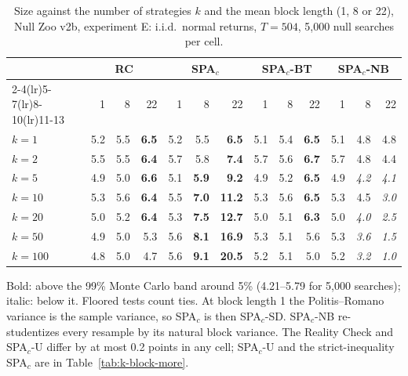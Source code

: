 \begin{table}[t]
\centering
\footnotesize
\setlength{\tabcolsep}{3.5pt}
\caption{Size against the number of strategies $k$ and the mean block length (1, 8 or 22), Null Zoo v2b, experiment E: i.i.d.\ normal returns, $T=504$, 5{,}000 null searches per cell.}
\label{tab:k-block}
\begin{tabular}{lrrrrrrrrrrrr}
\toprule
 & \multicolumn{3}{c}{RC} & \multicolumn{3}{c}{SPA$_c$} & \multicolumn{3}{c}{SPA$_c$-BT} & \multicolumn{3}{c}{SPA$_c$-NB} \\
\cmidrule(lr){2-4}\cmidrule(lr){5-7}\cmidrule(lr){8-10}\cmidrule(lr){11-13}
 & 1 & 8 & 22 & 1 & 8 & 22 & 1 & 8 & 22 & 1 & 8 & 22 \\
\midrule
$k=1$ & 5.2 & 5.5 & \textbf{6.5} & 5.2 & 5.5 & \textbf{6.5} & 5.1 & 5.4 & \textbf{6.5} & 5.1 & 4.8 & 4.8 \\
$k=2$ & 5.5 & 5.5 & \textbf{6.4} & 5.7 & 5.8 & \textbf{7.4} & 5.7 & 5.6 & \textbf{6.7} & 5.7 & 4.8 & 4.4 \\
$k=5$ & 4.9 & 5.0 & \textbf{6.6} & 5.1 & \textbf{5.9} & \textbf{9.2} & 4.9 & 5.2 & \textbf{6.5} & 4.9 & \textit{4.2} & \textit{4.1} \\
$k=10$ & 5.3 & 5.6 & \textbf{6.4} & 5.5 & \textbf{7.0} & \textbf{11.2} & 5.3 & 5.6 & \textbf{6.5} & 5.3 & 4.5 & \textit{3.0} \\
$k=20$ & 5.0 & 5.2 & \textbf{6.4} & 5.3 & \textbf{7.5} & \textbf{12.7} & 5.0 & 5.1 & \textbf{6.3} & 5.0 & \textit{4.0} & \textit{2.5} \\
$k=50$ & 4.9 & 5.0 & 5.3 & 5.6 & \textbf{8.1} & \textbf{16.9} & 5.3 & 5.1 & 5.6 & 5.3 & \textit{3.6} & \textit{1.5} \\
$k=100$ & 4.8 & 5.0 & 4.7 & 5.6 & \textbf{9.1} & \textbf{20.5} & 5.2 & 5.1 & 5.0 & 5.2 & \textit{3.2} & \textit{1.0} \\
\bottomrule
\end{tabular}
\par\smallskip\begin{minipage}{0.97\linewidth}\footnotesize Bold: above the 99\% Monte Carlo band around 5\% (4.21--5.79 for 5{,}000 searches); italic: below it. Floored tests count ties. At block length 1 the Politis--Romano variance is the sample variance, so SPA$_c$ is then SPA$_c$-SD. SPA$_c$-NB re-studentizes every resample by its natural block variance. The Reality Check and SPA$_c$-U differ by at most 0.2 points in any cell; SPA$_c$-U and the strict-inequality SPA$_c$ are in Table~\ref{tab:k-block-more}.\end{minipage}
\end{table}

